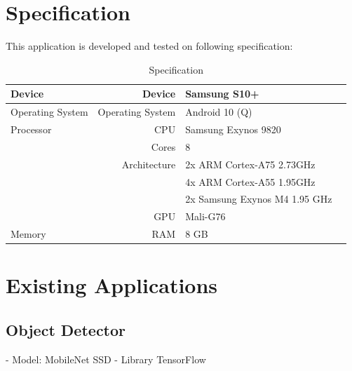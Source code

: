     \section{Specification}
        This application is developed and tested on following specification:

        \begin{table}[!htp]\centering
            \caption{Specification}\label{tab: }
            \scriptsize
            \begin{tabular}{lrll}\toprule
                Device              &Device             &Samsung S10+ \\ \hline
                Operating System    &Operating System   &Android 10 (Q) \\ \hline
                Processor           &CPU                &Samsung Exynos 9820 \\
                                    &Cores              &8 \\
                                    &Architecture       &2x ARM Cortex-A75 2.73GHz \\
                                    &                   &4x ARM Cortex-A55 1.95GHz \\
                                    &                   &2x Samsung Exynos M4 1.95 GHz \\
                                    &GPU                &Mali-G76 \\ \hline
                Memory              &RAM                &8 GB \\
                \bottomrule
            \end{tabular}
        \end{table}


    \section{Existing Applications}
        \subsection{Object Detector}

            - Model: MobileNet SSD
            - Library TensorFlow

